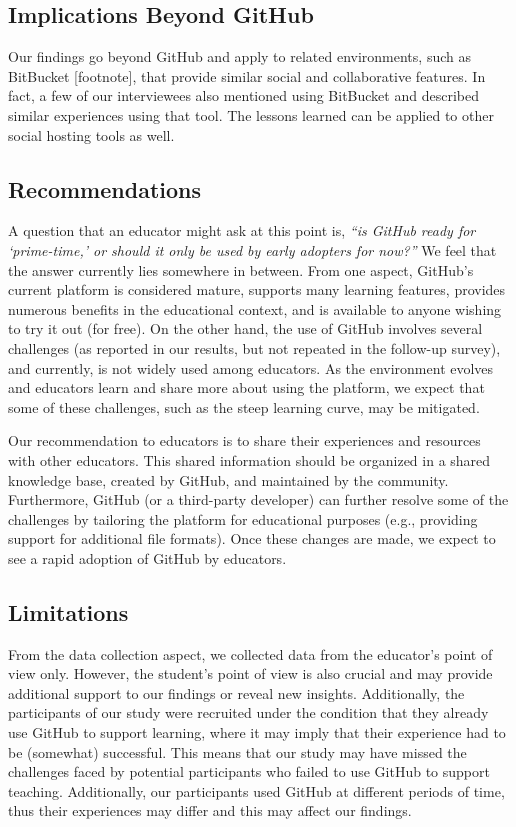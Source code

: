 \subsection{Implications Beyond GitHub}
Our findings go beyond GitHub and apply to related environments, such as BitBucket [footnote], that provide similar social and collaborative features. In fact, a few of our interviewees also mentioned using BitBucket and described similar experiences using that tool. The lessons learned can be applied to other social hosting tools as well.

\subsection{Recommendations}
A question that an educator might ask at this point is, \textit{``is GitHub ready for `prime-time,' or should it only be used by early adopters for now?''} We feel that the answer currently lies somewhere in between. From one aspect, GitHub's current platform is considered mature, supports many learning features, provides numerous benefits in the educational context, and is available to anyone wishing to try it out (for free). On the other hand, the use of GitHub involves several challenges (as reported in our results, but not repeated in the follow-up survey), and currently, is not widely used among educators. As the environment evolves and educators learn and share more about using the platform, we expect that some of these challenges, such as the steep learning curve, may be mitigated.

Our recommendation to educators is to share their experiences and resources with other educators. This shared information should be organized in a shared knowledge base, created by GitHub, and maintained by the community. Furthermore, GitHub (or a third-party developer) can further resolve some of the challenges by tailoring the platform for educational purposes (e.g., providing support for additional file formats). Once these changes are made, we expect to see a rapid adoption of GitHub by educators.

\subsection{Limitations}
\label{sec:limitations}
From the data collection aspect, we collected data from the educator's point of view only. However, the student's point of view is also crucial and may provide additional support to our findings or reveal new insights. Additionally, the participants of our study were recruited under the condition that they already use GitHub to support learning, where it may imply that their experience had to be (somewhat) successful. This means that our study may have missed the challenges faced by potential participants who failed to use GitHub to support teaching. Additionally, our participants used GitHub at different periods of time, thus their experiences may differ and this may affect our findings.
